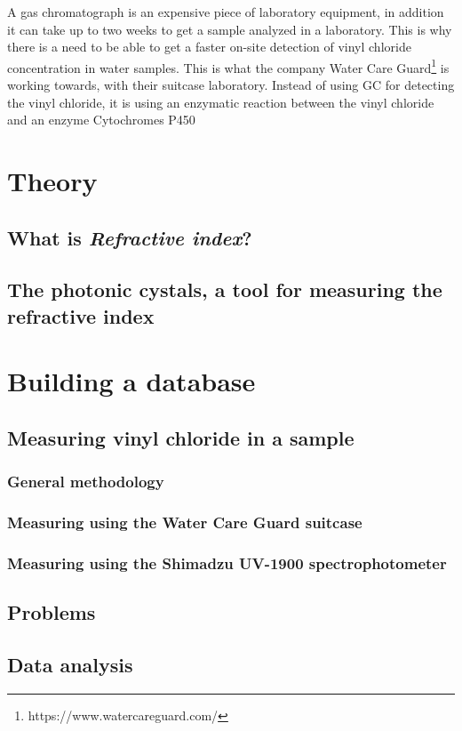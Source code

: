 \documentclass{article}
\begin{document}
A gas chromatograph is an expensive piece of laboratory equipment\cite{gc_cost_axion}, in addition it can take up to two weeks to get a sample analyzed in a laboratory\cite{water_analysis_cwt}.
This is why there is a need to be able to get a faster on-site detection of vinyl chloride concentration in water samples.
This is what the company Water Care Guard\footnote{https://www.watercareguard.com/} is working towards, with their suitcase laboratory.
Instead of using GC for detecting the vinyl chloride, it is using an enzymatic reaction between the vinyl chloride and an enzyme Cytochromes P450


\section{Theory}
\subsection{What is \textit{Refractive index}?}
\subsection{The photonic cystals, a tool for measuring the refractive index}

\newpage
\section{Building a database}
\subsection{Measuring vinyl chloride in a sample}
\subsubsection{General methodology}
\subsubsection{Measuring using the Water Care Guard suitcase}
\subsubsection{Measuring using the Shimadzu UV-1900 spectrophotometer}
\subsection{Problems}
\subsection{Data analysis}
\end{document}
